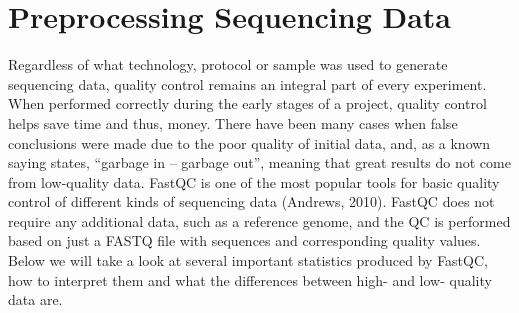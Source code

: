 \section{Preprocessing Sequencing Data}
Regardless of what technology, protocol or sample was used to generate sequencing data, quality control remains an integral part
of every experiment. When performed correctly during the early stages of a project, quality control helps save time and thus,
money. There have been many cases when false conclusions were made due to the poor quality of initial data, and, as a known
saying states, “garbage in – garbage out”, meaning that great results do not come from low-quality data.
FastQC is one of the most popular tools for basic quality control of different kinds of sequencing data (Andrews, 2010).
FastQC does not require any additional data, such as a reference genome, and the QC is performed based on just a FASTQ file with
sequences and corresponding quality values. Below we will take a look at several important statistics produced by FastQC, how to
interpret them and what the differences between high- and low- quality data are.




